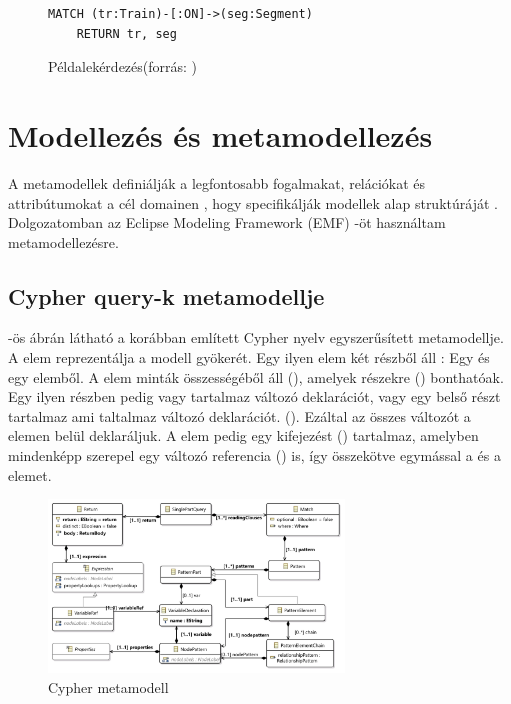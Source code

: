 \begin{figure}
	\begin{lstlisting}[style=viatrasmall]
	MATCH (tr:Train)-[:ON]->(seg:Segment)
	RETURN tr, seg	
	\end{lstlisting}   
	\caption{Példalekérdezés(forrás: \cite{marton2017model} )}
	\label{fig:példalekérdezes}
\end{figure}


\section{Modellezés és metamodellezés}
A metamodellek definiálják a legfontosabb fogalmakat, relációkat és attribútumokat a cél domainen , hogy 
specifikálják modellek alap struktúráját \cite{semerath2017formal}. Dolgozatomban az Eclipse Modeling Framework
 (EMF) \cite{EMF} -öt használtam metamodellezésre.



\subsection{Cypher query-k metamodellje}
 -ös ábrán látható a korábban említett Cypher nyelv egyszerűsített metamodellje. A  elem reprezentálja a modell gyökerét. Egy ilyen elem két részből áll : Egy  és egy  elemből. A  elem minták összességéből áll (), amelyek részekre () bonthatóak. Egy ilyen részben pedig vagy tartalmaz változó deklarációt, vagy egy belső részt tartalmaz ami taltalmaz változó deklarációt. (). Ezáltal az összes változót a  elemen belül deklaráljuk. A  elem  pedig egy kifejezést () tartalmaz, amelyben mindenképp szerepel egy változó referencia () is, így összekötve egymással a  és a  elemet. 

\begin{figure}
	\centering
	\includegraphics[width=0.7\textwidth]{figures/openCypherClassDiagram}
	\caption{Cypher metamodell}
	\label{fig:cyphermetamodell}
\end{figure}


